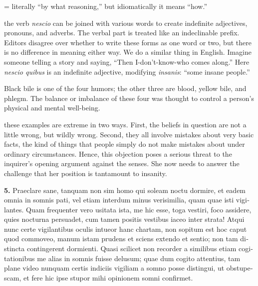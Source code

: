 = literally ``by what reasoning,'' but idiomatically it means ``how.''

 the verb \textit{nescio} can be joined with various words to create indefinite adjectives, pronouns, and adverbs. The verbal part is treated like an indeclinable prefix. Editors disagree over whether to write these forms as one word or two, but there is no difference in meaning either way. We do a similar thing in English. Imagine someone telling a story and saying, ``Then I-don't-know-who comes along.'' Here \textit{nescio quibus} is an indefinite adjective, modifying \textit{insanis}: ``some insane people.''

 Black bile is one of the four humors; the other three are blood, yellow bile, and phlegm. The balance or imbalance of these four was thought to control a person's physical and mental well-being.

 these examples are extreme in two ways. First, the beliefs in question are not a little wrong, but wildly wrong. Second, they all involve mistakes about very basic facts, the kind of things that people simply do not make mistakes about under ordinary circumstances. Hence, this objection poses a serious threat to the inquirer's opening argument against the senses. She now needs to answer the challenge that her position is tantamount to insanity.

\clearpage

\beginnumbering
\pstart
\begin{latin}
\textenglish{\textbf{5.}} Praeclare sane, tanquam non sim homo qui soleam noctu dormire, et eadem omnia in somnis pati, vel etiam interdum minus verisimilia, quam quae isti vigilantes. Quam frequenter vero usitata ista, me hic esse, toga vestiri, foco assidere, quies nocturna persuadet, cum tamen positis vestibus iaceo inter strata! Atqui nunc certe vigilantibus oculis intueor hanc chartam, non sopitum est hoc caput quod commoveo, manum istam prudens et sciens extendo et sentio; non tam distincta contingerent dormienti. Quasi scilicet non recorder a similibus etiam cogitationibus me alias in somnis fuisse delusum; quae dum cogito attentius, tam plane video nunquam certis indiciis vigiliam a somno posse distingui, ut obstupescam, et fere hic ipse stupor mihi opinionem somni confirmet.
\end{latin}
\pend
\endnumbering

